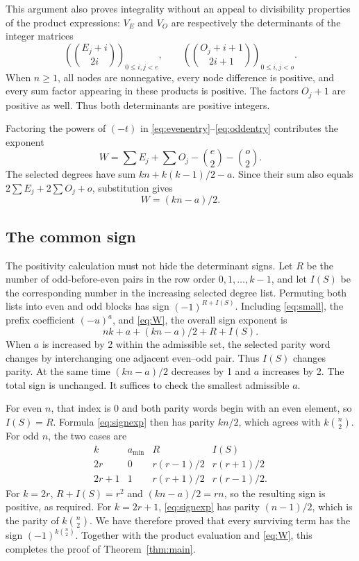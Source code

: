 \documentclass[11pt,letterpaper]{article}
\numberwithin{equation}{section}
\theoremstyle{definition}
\begin{document}
This argument also proves integrality without an appeal to divisibility
properties of the product expressions: \(V_E\) and \(V_O\) are
respectively the determinants of the integer matrices
\[
 \left(\binom{E_j+i}{2i}\right)_{0\le i,j<e},\qquad
 \left(\binom{O_j+i+1}{2i+1}\right)_{0\le i,j<o}.
\]
When \(n\ge1\), all nodes are nonnegative, every node difference is
positive, and every sum factor appearing in these products is positive.
The factors \(O_j+1\) are positive as well. Thus both determinants
are positive integers.

Factoring the powers of \((-t)\) in
\eqref{eq:evenentry}--\eqref{eq:oddentry} contributes the exponent
\[
 W=\sum E_j+\sum O_j-\binom e2-\binom o2.
\]
The selected degrees have sum
\(kn+k(k-1)/2-a\). Since their sum also equals
\(2\sum E_j+2\sum O_j+o\), substitution gives
\begin{equation}\label{eq:W}
 W=(kn-a)/2.
\end{equation}

\subsection{The common sign}
The positivity calculation must not hide the determinant signs. Let
\(R\) be the number of odd-before-even pairs in the row order
\(0,1,\ldots,k-1\), and let \(I(S)\) be the corresponding number
in the increasing selected degree list. Permuting both lists into even
and odd blocks has sign \((-1)^{R+I(S)}\). Including
\eqref{eq:small}, the prefix coefficient \((-u)^a\), and
\eqref{eq:W}, the overall sign exponent is
\begin{equation}\label{eq:signexp}
 nk+a+(kn-a)/2+R+I(S).
\end{equation}
When \(a\) is increased by 2 within the admissible set, the selected
parity word changes by interchanging one adjacent even--odd pair.
Thus \(I(S)\) changes parity. At the same time \((kn-a)/2\)
decreases by 1 and \(a\) increases by 2. The total sign is unchanged.
It suffices to check the smallest admissible \(a\).

For even \(n\), that index is 0 and both parity words begin with an
even element, so \(I(S)=R\). Formula \eqref{eq:signexp} then has
parity \(kn/2\), which agrees with \(k\binom n2\).
For odd \(n\), the two cases are
\[
\begin{array}{c|c|c|c}
 k & a_{\min} & R & I(S)\\ \hline
 2r & 0 & r(r-1)/2 & r(r+1)/2\\
 2r+1 & 1 & r(r+1)/2 & r(r-1)/2.
\end{array}
\]
For \(k=2r\), \(R+I(S)=r^2\) and \((kn-a)/2=rn\), so
the resulting sign is positive, as required. For \(k=2r+1\),
\eqref{eq:signexp} has parity \((n-1)/2\), which is the parity of
\(k\binom n2\). We have therefore proved that every surviving term
has the sign \((-1)^{k\binom n2}\).
Together with the product evaluation and \eqref{eq:W}, this completes
the proof of Theorem~\ref{thm:main}.
\end{document}
